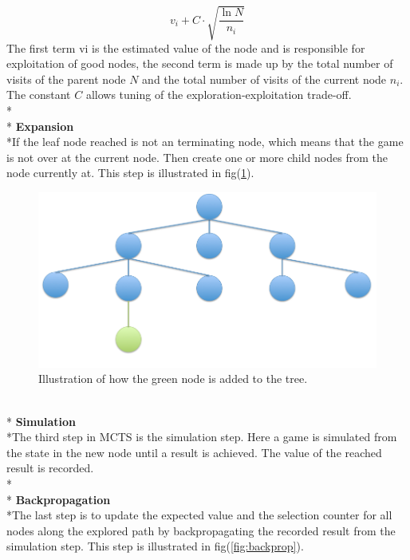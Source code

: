 \documentclass[journal]{vgtc}                %
\begin{document}
\begin{equation} \label{eq:upperconfidence}
	v_{i} + C \cdot \sqrt{\frac{\ln N}{n_{i}}}
\end{equation}
The first term vi is the estimated value of the node and is responsible for exploitation of good nodes, the second term is made up by the total number of visits of the parent node $N$ and the total number of visits of the current node $n_{i}$. The constant $C$ allows tuning of the exploration-exploitation trade-off. 
\\*\\*
\textbf{Expansion}
\\*If the leaf node reached is not an terminating node, which means that the game is not over at the current node. Then create one or more child nodes from the node currently at. This step is illustrated in fig(\ref{fig:expansion}).
\begin{figure}[here]
  \begin{center}
    \includegraphics[scale=0.28]{img/tree1.png}
    \caption{\label{fig:expansion} Illustration of how the green node is added to the tree.}
  \end{center}
\end{figure}
\\*
\textbf{Simulation}
\\*The third step in MCTS is the simulation step. Here a game is simulated from the state in the new node until a result is achieved. The value of the reached result is recorded.
\\*\\*
\textbf{Backpropagation}
\\*The last step is to update the expected value and the selection counter for all nodes along the explored path by backpropagating the recorded result from the simulation step. This step is illustrated in fig(\ref{fig:backprop}).
\end{document}
